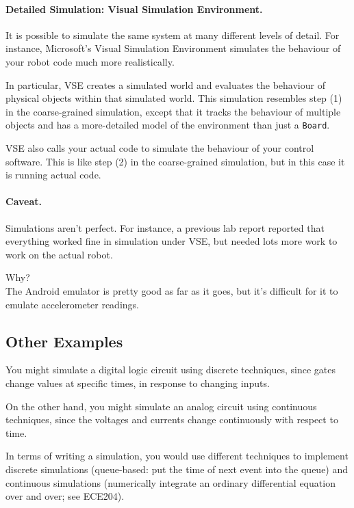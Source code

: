 \paragraph{Detailed Simulation: Visual Simulation Environment.}
It is possible to simulate the same system at many different levels of
detail. For instance, Microsoft's Visual Simulation Environment
simulates the behaviour of your robot code much more realistically.

In particular, VSE creates a simulated world and evaluates the 
behaviour of physical objects within that simulated world.
This simulation resembles step (1) in the coarse-grained simulation,
except that it tracks the behaviour of multiple objects and has a
more-detailed model of the environment than just a {\tt Board}.

VSE also calls your actual code to simulate the behaviour
of your control software. This is like step (2) in the coarse-grained
simulation, but in this case it is running actual code.

\paragraph{Caveat.} Simulations aren't perfect. 
For instance, a previous lab report reported that everything worked
fine in simulation under VSE, but needed lots more work to work on the
actual robot.

{\sf Why?}\\[2em]


The Android emulator is pretty good as far as it goes, but it's
difficult for it to emulate accelerometer readings.

\subsection*{Other Examples} 
You might simulate a digital logic circuit using discrete techniques,
since gates change values at specific times, in response to changing
inputs.

On the other hand, you might simulate an analog circuit using continuous
techniques, since the voltages and currents change continuously with
respect to time.

In terms of writing a simulation, you would use different techniques
to implement discrete simulations (queue-based: put the time of next
event into the queue) and continuous simulations (numerically
integrate an ordinary differential equation over and over; see
ECE204).




